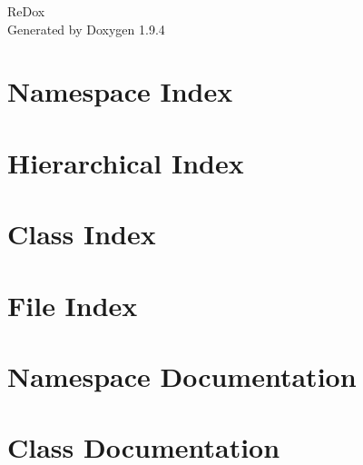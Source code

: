 \documentclass[twoside]{book}
\newcommand{\+}{\discretionary{\mbox{\scriptsize$\hookleftarrow$}}{}{}}
\newcommand{\clearemptydoublepage}{%
    \newpage{\pagestyle{empty}\cleardoublepage}%
  }
\begin{document}
  \raggedbottom
    \hypersetup{pageanchor=false,
                bookmarksnumbered=true,
                pdfencoding=unicode
               }
  \begin{titlepage}
  \vspace*{7cm}
  \begin{center}%
  {\Large Re\+Dox}\\
  \vspace*{1cm}
  {\large Generated by Doxygen 1.9.4}\\
  \end{center}
  \end{titlepage}
  \clearemptydoublepage
  \tableofcontents
  \clearemptydoublepage
  \hypersetup{pageanchor=true}
\chapter{Namespace Index}

\chapter{Hierarchical Index}

\chapter{Class Index}

\chapter{File Index}

\chapter{Namespace Documentation}

\chapter{Class Documentation}

































\end{document}
